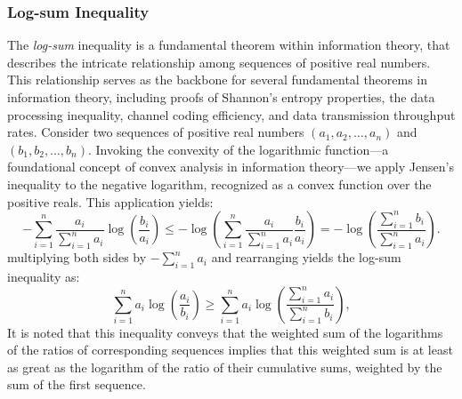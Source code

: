 \documentclass[journal,12pt,onecolumn,draftclsnofoot,]{IEEEtran}
\begin{document}
	\subsubsection{Log-sum Inequality}
	 The \emph{log-sum} inequality is a fundamental theorem within information theory, that describes the intricate relationship among sequences of positive real numbers. This relationship serves as the backbone for several fundamental theorems in information theory, including proofs of Shannon's entropy properties, the data processing inequality, channel coding efficiency, and data transmission throughput rates.
	Consider two sequences of positive real numbers \((a_1, a_2, \ldots, a_n)\) and \((b_1, b_2, \ldots, b_n)\). Invoking the convexity of the logarithmic function—a foundational concept of convex analysis in information theory—we apply Jensen's inequality to the negative logarithm, recognized as a convex function over the positive reals. This application yields:
	\begin{equation}
		-\sum_{i=1}^{n} \frac{a_i}{\sum_{i=1}^{n} a_i} \log\left(\frac{b_i}{a_i}\right) \leq -\log\left(\sum_{i=1}^{n} \frac{a_i}{\sum_{i=1}^{n} a_i} \frac{b_i}{a_i}\right) = -\log\left(\frac{\sum_{i=1}^{n} b_i}{\sum_{i=1}^{n} a_i}\right).
	\end{equation}
	multiplying both sides by \(-\sum_{i=1}^{n} a_i\) and rearranging yields the log-sum inequality as:
	\begin{equation}
		\sum_{i=1}^{n} a_i \log\left(\frac{a_i}{b_i}\right) \geq  \sum_{i=1}^{n} a_i \log\left(\frac{\sum_{i=1}^{n} a_i}{\sum_{i=1}^{n} b_i}\right),
	\end{equation}
	It is noted that this inequality conveys that the weighted sum of the logarithms of the ratios of corresponding sequences implies that this weighted sum is at least as great as the logarithm of the ratio of their cumulative sums, weighted by the sum of the first sequence.
\end{document}
